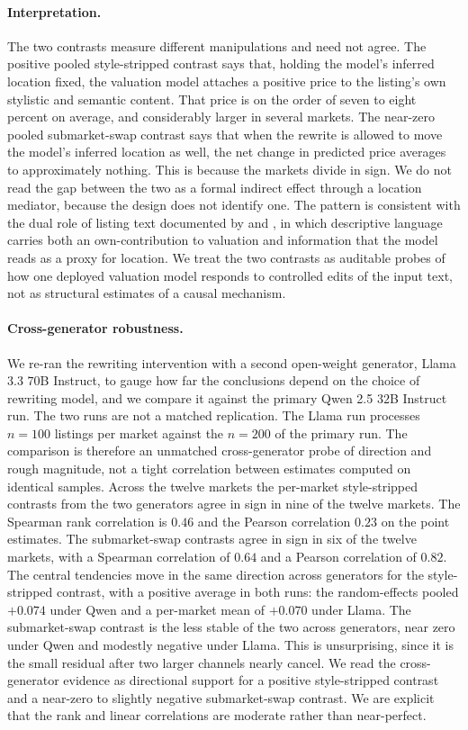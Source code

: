 \paragraph{Interpretation.} The two contrasts measure different manipulations and
need not agree. The positive pooled style-stripped contrast says that, holding the model's inferred location fixed, the valuation model attaches a positive price to the listing's own stylistic and semantic content. That price is on the order of seven to eight percent on average, and considerably larger in several markets. The near-zero pooled submarket-swap contrast says that when the rewrite is allowed to move the model's inferred location as well, the net change in predicted price averages to approximately nothing. This is because the markets divide in sign. We do not read the gap between the two as a formal indirect effect through a location mediator, because the design does not identify one. The pattern is consistent with the dual role of listing text documented by \citet{shen2021information} and \citet{baur2023automated}, in which descriptive language carries both an own-contribution to valuation and information that the model reads as a proxy for location. We treat the two contrasts as auditable probes of how one deployed
valuation model responds to controlled edits of the input text, not as structural
estimates of a causal mechanism.

\paragraph{Cross-generator robustness.} We re-ran the rewriting intervention with
a second open-weight generator, Llama 3.3 $70$B Instruct, to gauge how far the
conclusions depend on the choice of rewriting model, and we compare it against
the primary Qwen 2.5 $32$B Instruct run. The two runs are not a matched
replication. The Llama run processes $n=100$ listings per market against the $n=200$ of the primary run. The comparison is therefore an unmatched cross-generator probe of direction and rough magnitude, not a tight correlation between estimates computed on identical samples. Across the twelve markets the per-market style-stripped contrasts from the two generators agree in sign in nine of the twelve markets. The Spearman rank correlation is $0.46$ and the Pearson correlation $0.23$ on the point estimates. The submarket-swap contrasts agree in sign in six of the twelve markets, with a Spearman correlation of $0.64$ and a Pearson correlation of $0.82$. The central tendencies move in the same direction across generators for the style-stripped contrast, with a positive average in both runs: the random-effects pooled $+0.074$ under Qwen and a per-market mean of $+0.070$ under Llama. The submarket-swap contrast is the less stable of the two across generators, near zero under Qwen and modestly negative under Llama. This is unsurprising, since it is the small residual after two larger channels nearly cancel. We read the cross-generator evidence as directional support for a positive style-stripped contrast and a near-zero to slightly negative submarket-swap contrast. We are explicit that the rank and linear correlations are moderate rather than near-perfect.
